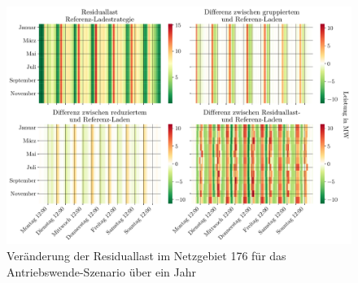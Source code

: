 \begin{figure}[H]
    \centering
    \includegraphics[width=\textwidth]{Bilder/residual_load_diff}
    \caption{Veränderung der Residuallast im Netzgebiet \num{176} für das Antriebswende-Szenario über ein Jahr}\label{fig:residual_load_diff}
\end{figure}